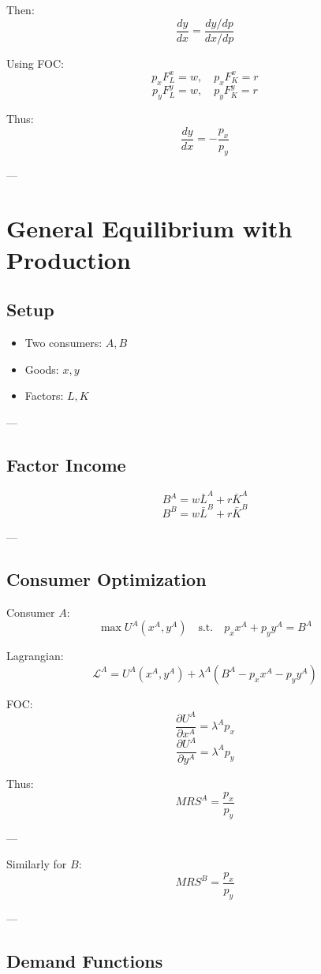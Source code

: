 Then:
\[
\frac{dy}{dx} = \frac{dy/dp}{dx/dp}
\]

Using FOC:
\[
p_x F_L^x = w, \quad p_x F_K^x = r
\]
\[
p_y F_L^y = w, \quad p_y F_K^y = r
\]

Thus:
\[
\frac{dy}{dx} = -\frac{p_x}{p_y}
\]

---

\section{General Equilibrium with Production}

\subsection{Setup}

\begin{itemize}
    \item Two consumers: $A, B$
    \item Goods: $x, y$
    \item Factors: $L, K$
\end{itemize}

---

\subsection{Factor Income}

\[
B^A = w\bar{L}^A + r\bar{K}^A
\]
\[
B^B = w\bar{L}^B + r\bar{K}^B
\]

---

\subsection{Consumer Optimization}

Consumer $A$:
\[
\max U^A(x^A, y^A)
\quad \text{s.t.} \quad
p_x x^A + p_y y^A = B^A
\]

Lagrangian:
\[
\mathcal{L}^A = U^A(x^A, y^A) + \lambda^A(B^A - p_x x^A - p_y y^A)
\]

FOC:
\[
\frac{\partial U^A}{\partial x^A} = \lambda^A p_x
\]
\[
\frac{\partial U^A}{\partial y^A} = \lambda^A p_y
\]

Thus:
\[
MRS^A = \frac{p_x}{p_y}
\]

---

Similarly for $B$:
\[
MRS^B = \frac{p_x}{p_y}
\]

---

\subsection{Demand Functions}

